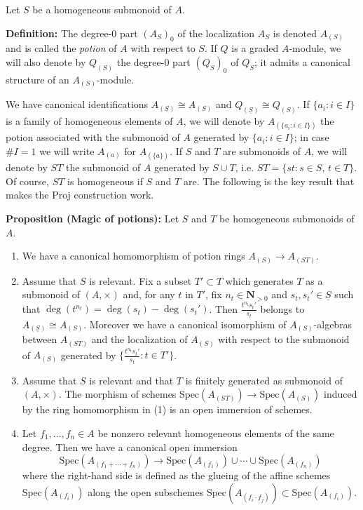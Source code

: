 \documentclass[graybox]{svmult}
\begin{document}
Let $S$ be a homogeneous submonoid of $A$. 


\vspace{0.25\baselineskip}
\noindent
\textbf{\textbf{Definition:}}
The degree-$0$ part $(A_S)_0$ of the localization $A_{S}$ is denoted $A_{(S)}$ and is called the \emph{potion} of $A$ with respect to $S$. 
If $Q$ is a graded $A$-module, we will also denote by $Q_{(S)}$ the degree-$0$ part $(Q_S)_0$ of $Q_S$; it admits a canonical structure of an $A_{(S)}$-module.




We have canonical identifications
$A_{(\underline{S})} \cong A_{(S)}$ and $Q_{(\underline{S})} \cong Q_{(S)}$.
If  $\{a_i : i \in I \}$ is a family of homogeneous elements of $A$, we will denote by
$A_{(\{a_i : i \in I \})}$
the potion associated with the submonoid of $A$ generated by $\{a_i : i \in I \}$; in case $\#I=1$ we will write $A_{(a)}$ for $A_{(\{a\})}$.
If $S$ and $T$ are submonoids of $A$, we will denote by $ST$ the submonoid of $A$ generated by $S \cup T$, i.e. $ST = \{st : s \in S, \, t \in T \}$. Of course, $ST$ is homogeneous if $S$ and $T$ are.
The following is the key result that makes the Proj construction work.

\vspace{0.25\baselineskip}
\noindent
\textbf{{Proposition (Magic of potions):}}
Let $S$ and $T$ be homogeneous submonoids of $A$. 
\begin{enumerate}
\item 
\label{it:magic-1}
We have a canonical homomorphism of potion rings 
$A_{(S )} \to  A_{(ST )}$.
\item 
\label{it:magic-2}
Assume that $S$ is relevant. Fix a subset $T' \subset T$ which generates $T$ as a submonoid of $(A,\times)$ and, for any $t $ in $T'$, fix $n_t \in \mathbf{N}_{>0}$ and $s_t, s_t' \in \underline{S}$ such that $\deg(t^{n_t}) = \deg(s_t)-\deg(s_t')$.
Then $\frac{t^{n_t} s_t'} { s_t}$ belongs to $A_{(\underline{S} )}\cong A_{(S)}$. 
 Moreover we have a canonical isomorphism of $A_{(S )}$-algebras between $ A_{(ST )}$ and the localization of $A_{(S )}$ with respect to the submonoid of $A_{(S)}$ generated by $\{\frac{t^{n_t} s_t'} { s_t} : t \in T' \}$.
\item 
\label{it:magic-3}
Assume that $S$ is relevant and that $T$ is finitely generated as submonoid of $(A,\times)$. The morphism of schemes 
$
\mathrm{Spec} (A_{(ST )}) \to \mathrm{Spec} (A_{(S)})
$
induced by the ring homomorphism in (1) is an open immersion of schemes.
\item 
\label{it:magic-4}
Let $f_1, \ldots, f_n \in A$ be nonzero relevant homogeneous elements of the same degree.
Then we have a canonical open immersion
\[
\mathrm{Spec}(A_{ (f_1 + \cdots + f_n) }) \to \mathrm{Spec} (A_{(f_1)}) \cup \cdots \cup \mathrm{Spec} (A_{(f_n)})
\]
where the right-hand side is defined as the glueing of the affine schemes $\mathrm{Spec} (A_{(f_i)})$ along the open subschemes $\mathrm{Spec} (A_{(f_i \cdot f_j)}) \subset \mathrm{Spec} (A_{(f_i)})$.
\end{enumerate}
\end{document}
